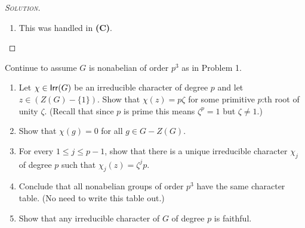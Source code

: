 \begin{proof}[{\scshape Solution}]
\begin{enumerate}[font=\normalfont,label=\textbf{(\Alph*)}, wide]
    \item This was handled in \textbf{(C)}.
  \end{enumerate}
\end{proof}

\newpage

\begin{problem}
Continue to assume $G$ is nonabelian of order $p^3$ as in Problem 1.
\begin{enumerate}[font=\normalfont,label=\textbf{(\Alph*)}, wide]


  \item Let $\chi \in \mathsf{Irr}(G)$ be an irreducible character of degree $p$ and let $z\in(Z(G)-\{1\})$. Show that $\chi(z) = p\zeta$ for some primitive $p$:th root of unity $\zeta$. (Recall that since $p$ is prime this means $\zeta^p =1$ but $\zeta \neq 1$.)
  \item Show that $\chi(g) = 0$ for all $g \in G - Z(G)$.
  \item For every $1\leq j\leq p-1$, show that there is a unique irreducible character $\chi_j$ of degree $p$ such that $\chi_j(z) = \zeta^jp$.
  \item Conclude that all nonabelian groups of order $p^3$ have the same character table. (No need to write this table out.)
  \item Show that any irreducible character of $G$ of degree $p$ is faithful.
\end{enumerate}
\end{problem}

